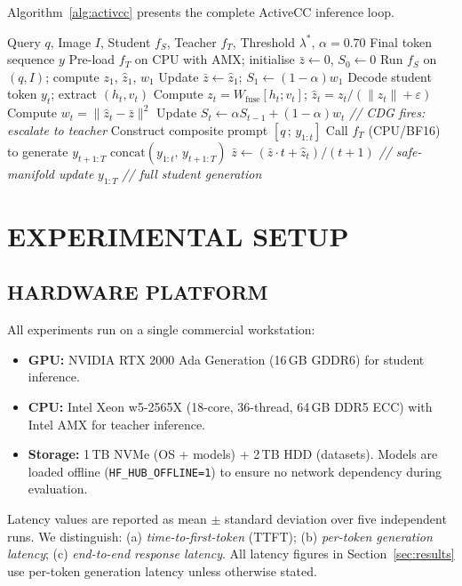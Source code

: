 \documentclass{ieeetmlcn}
\begin{document}
Algorithm~\ref{alg:activcc} presents the complete ActiveCC inference
loop.

\begin{algorithm}
\caption{ActiveCC Runtime Inference}
\label{alg:activcc}
\begin{algorithmic}[1]
\REQUIRE Query $q$, Image $I$, Student $f_S$, Teacher $f_T$,
         Threshold $\lambda^*$, $\alpha=0.70$
\ENSURE Final token sequence $y$
\STATE Pre-load $f_T$ on CPU with AMX; initialise $\bar{z}\leftarrow 0$,
       $S_0\leftarrow 0$
\STATE Run $f_S$ on $(q,I)$; compute $z_1$, $\hat{z}_1$, $w_1$
\STATE Update $\bar{z}\leftarrow\hat{z}_1$; $S_1\leftarrow(1-\alpha)w_1$
  \STATE Decode student token $y_t$; extract $(h_t, v_t)$
  \STATE Compute $z_t = W_{\text{fuse}}[h_t;v_t]$;
         $\hat{z}_t = z_t/(\|z_t\|+\varepsilon)$
  \STATE Compute $w_t = \|\hat{z}_t - \bar{z}\|^2$
  \STATE Update $S_t \leftarrow \alpha S_{t-1} + (1-\alpha)w_t$
    \STATE \textit{// CDG fires: escalate to teacher}
    \STATE Construct composite prompt $[q\,;\,y_{1:t}]$
    \STATE Call $f_T$ (CPU/BF16) to generate $y_{t+1:T}$
    \RETURN $\mathrm{concat}(y_{1:t},\, y_{t+1:T})$
  \ELSE
    \STATE $\bar{z} \leftarrow (\bar{z}\cdot t + \hat{z}_t)/(t+1)$
           \quad\textit{// safe-manifold update}
  \ENDIF
\ENDFOR
\RETURN $y_{1:T}$ \quad\textit{// full student generation}
\end{algorithmic}
\end{algorithm}

\section{EXPERIMENTAL SETUP}

\subsection{HARDWARE PLATFORM}
All experiments run on a single commercial workstation:
\begin{itemize}
  \item \textbf{GPU:} NVIDIA RTX 2000 Ada Generation (16\,GB GDDR6) for student inference.
  \item \textbf{CPU:} Intel Xeon w5-2565X (18-core, 36-thread, 64\,GB DDR5 ECC) with
        Intel AMX for teacher inference.
  \item \textbf{Storage:} 1\,TB NVMe (OS + models) + 2\,TB HDD (datasets). Models are loaded offline (\texttt{HF\_HUB\_OFFLINE=1}) to ensure no network dependency during evaluation.
\end{itemize}
Latency values are reported as mean $\pm$ standard deviation over five
independent runs. We distinguish: (a) \emph{time-to-first-token} (TTFT);
(b) \emph{per-token generation latency}; (c) \emph{end-to-end response
latency}. All latency figures in Section~\ref{sec:results} use per-token
generation latency unless otherwise stated.
\end{document}
